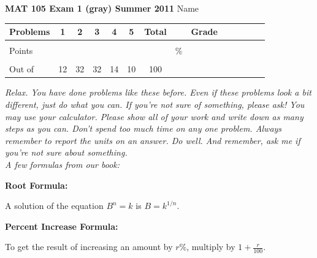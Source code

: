 \documentclass[12pt]{article}
\begin{document}
\textbf{MAT 105 Exam 1 (gray) Summer 2011} \hspace{.4in} {\large Name} \hrulefill

\begin{center}

\begin{tabular}
{|l|c|c|c|c|c|c|c|c|c|c|c|c|c|} \hline

 Problems & \hspace{5 pt} 1 \hspace{5 pt}  & \hspace{5 pt} 2 \hspace{5 pt} & \hspace{5 pt} 3 \hspace{5 pt} & \hspace{5 pt} 4 \hspace{5 pt} & \hspace{5 pt} 5 \hspace{5 pt} & \hspace{5 pt} Total  \hspace{5 pt} & &  \hspace{5 pt} Grade \hspace{5 pt}  \\ \hline
&&&&&&&&\\  
Points &&&&&&&    \hspace{.8in}\% &  \\ 
&&&&&&&& \\  \hline
Out of & 12 & 32 & 32 & 14 & 10 &100 & & \\ \hline

\end {tabular}

\end{center}

\vspace{.2in}

 \emph{Relax.  You have done problems like these before.  Even if these problems look a bit different, just do what you can.  If you're not sure of something, please ask! You may use your calculator.  Please show all of your work and write down as many steps as you can.  Don't spend too much time on any one problem.  Always remember to report the units on an answer. Do well.  And remember, ask me if you're not sure about something.}\\

\vspace{.5in} 
\noindent \emph{A few formulas from our book:}

\begin{center}

\textbf{Root Formula:} 

A solution of the equation $B^n=k$ is $B=k^{1/n}$.

\vspace{.2in} 

\textbf{Percent Increase Formula:} 

To get the result of increasing an amount by $r$\%, multiply by $1 + \frac{r}{100}$.

\end{center}
\end{document}
